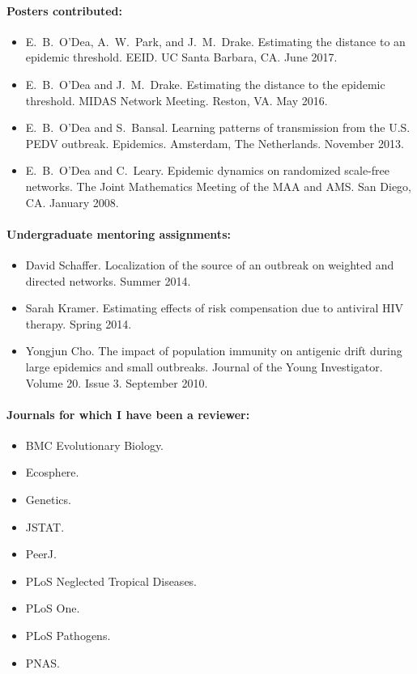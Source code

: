 \documentclass[a4paper]{article}
\begin{document}
\paragraph{Posters contributed:}
\begin{itemize}
  \item[~] E.\ B.\ O'Dea, A.\ W.\ Park, and J.\ M.\ Drake. Estimating the distance to
    an epidemic threshold. EEID. UC Santa Barbara, CA. June  2017.
  \item[~] E.\ B.\ O'Dea and J.\ M.\ Drake. Estimating the distance to
    the epidemic threshold. MIDAS Network Meeting.  Reston,
    VA. May 2016.
  \item[~] E.\ B.\ O'Dea and S.\ Bansal. Learning patterns of
    transmission from the U.S. PEDV outbreak. Epidemics.
    Amsterdam, The Netherlands. November 2013.
  \item[~] E.\ B.\ O'Dea and C.\ Leary. Epidemic dynamics on
    randomized scale-free networks.  The Joint Mathematics Meeting
    of the MAA and AMS. San Diego, CA. January 2008.
\end{itemize}

\paragraph{Undergraduate mentoring assignments:}

\begin{itemize}
  \item[~] David Schaffer. Localization of the source of an outbreak
    on weighted and directed networks. Summer 2014.
  \item[~] Sarah Kramer. Estimating effects of risk compensation due
    to antiviral HIV therapy. Spring 2014.
  \item[~] Yongjun Cho. The impact of population immunity on antigenic
    drift during large epidemics and small outbreaks. Journal of the
    Young Investigator. Volume 20. Issue 3. September 2010.
\end{itemize}

\paragraph{Journals for which I have been a reviewer:}
\begin{itemize}
  \item[~] BMC Evolutionary Biology.
  \item[~] Ecosphere.
  \item[~] Genetics.
  \item[~] JSTAT.
  \item[~] PeerJ.
  \item[~] PLoS Neglected Tropical Diseases.
  \item[~] PLoS One.
  \item[~] PLoS Pathogens.
  \item[~] PNAS.
\end{itemize}
\end{document}
